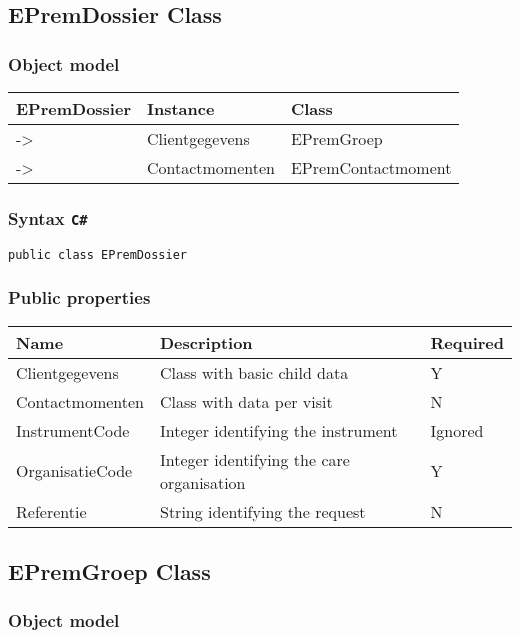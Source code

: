\documentclass[]{book}
\begin{document}
\hypertarget{epremdossier-class}{%
\subsection{EPremDossier Class}\label{epremdossier-class}}

\hypertarget{object-model}{%
\subsubsection{Object model}\label{object-model}}

\begin{longtable}[]{@{}lll@{}}
\toprule
EPremDossier & Instance & Class\tabularnewline
\midrule
\endhead
-\textgreater{} & Clientgegevens & EPremGroep\tabularnewline
-\textgreater{} & Contactmomenten & EPremContactmoment\tabularnewline
\bottomrule
\end{longtable}

\hypertarget{syntax-c}{%
\subsubsection{\texorpdfstring{Syntax \texttt{C\#}}{Syntax C\#}}\label{syntax-c}}

\texttt{public\ class\ EPremDossier}

\hypertarget{public-properties}{%
\subsubsection{Public properties}\label{public-properties}}

\begin{longtable}[]{@{}lll@{}}
\toprule
Name & Description & Required\tabularnewline
\midrule
\endhead
Clientgegevens & Class with basic child data & Y\tabularnewline
Contactmomenten & Class with data per visit & N\tabularnewline
InstrumentCode & Integer identifying the instrument & Ignored\tabularnewline
OrganisatieCode & Integer identifying the care organisation & Y\tabularnewline
Referentie & String identifying the request & N\tabularnewline
\bottomrule
\end{longtable}

\hypertarget{epremgroep-class}{%
\subsection{EPremGroep Class}\label{epremgroep-class}}

\hypertarget{object-model-1}{%
\subsubsection{Object model}\label{object-model-1}}
\end{document}
